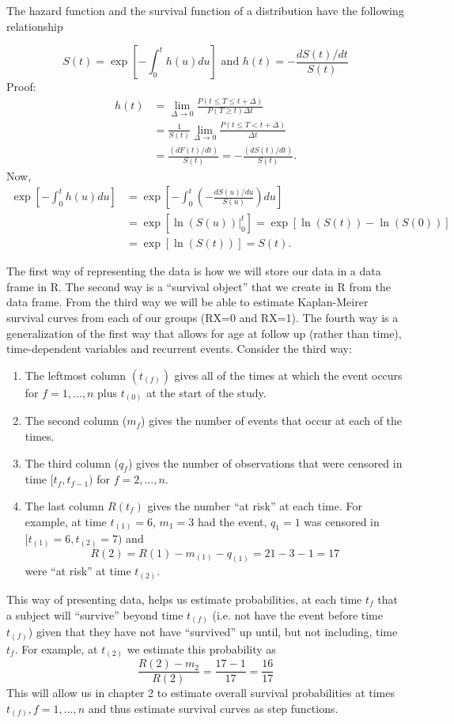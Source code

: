\documentclass{article}
\begin{document}
 The hazard function and the survival function of a distribution have the following relationship

\[ S(t) = \exp\left[-\int_0^t h(u) du\right] \text{ and } h(t) = -\frac{d S(t)/dt}{S(t)}
\]
Proof:
\begin{align*} h(t) & = \lim_{\Delta \rightarrow 0} \frac{P(t \le T \le t + \Delta)} {P(T \ge t) \Delta t} \\
& = \frac{1}{S(t)} \lim_{\Delta \rightarrow 0} \frac{P(t \le T < t + \Delta)} {\Delta t} \\
& = \frac{(dF(t)/dt)}{S(t)} = -\frac{(d S(t)/dt)}{S(t)}.
\end{align*}
Now,
\begin{align*}
\exp\left[-\int_0^t h(u) du\right] & = \exp\left[-\int_0^t \left(-\frac{dS(u)/du}{S(u)} \right)du\right] \\
&= \exp\left[\ln (S(u)) |_0^t \right] = \exp\left[\ln(S(t)) - \ln(S(0))\right] \\
& = \exp\left[\ln(S(t))\right] = S(t).
\end{align*}

 The first way of representing the data is how we will store our data in a data frame in R. The second way is a ``survival object'' that we create in R from the data frame. From the third way we will be able to estimate Kaplan-Meirer survival curves from each of our groups (RX=0 and RX=1). The fourth way is a generalization of the first way that allows for age at follow up (rather than time), time-dependent variables and recurrent events. Consider the third way:
\begin{enumerate}[ ]
\item The leftmost column $(t_{(f)})$ gives all of the times at which the event occurs for $f=1,\ldots,n$ plus $t_{(0)}$ at the start of the study.
\item The second column ($m_f$) gives the number of events that occur at each of the times.
\item The third column ($q_f$) gives the number of observations that were censored in time $[t_f,t_{f-1})$ for $f=2,\ldots,n$.
\item The last column $R(t_f)$ gives the number ``at risk'' at each time. For example, at time $t_{(1)}=6$, $m_{1}=3$ had the event, $q_{1}=1$ was censored in $[t_{(1)}=6, t_{(2)}=7)$ and
    \[
    R(2)=R(1)-m_{(1)}-q_{(1)}=21-3-1=17
    \]
     were ``at risk'' at time $t_{(2)}$.
\end{enumerate}
This way of presenting data, helps us estimate probabilities, at each time $t_{f}$ that a subject will ``survive'' beyond time $t_{(f)}$ (i.e. not have the event before time $t_{(f)}$) given that they have not have ``survived'' up until, but not including, time $t_{f}$. For example, at $t_{(2)}$ we estimate this probability as
\[ \dfrac{R(2)-m_2}{R{(2)}} = \dfrac{17-1}{17} = \dfrac{16}{17}
\]
This will allow us in chapter 2 to estimate overall survival probabilities at times $t_{(f)}, f=1,\ldots,n$ and thus estimate survival curves as step functions.
\end{document}
